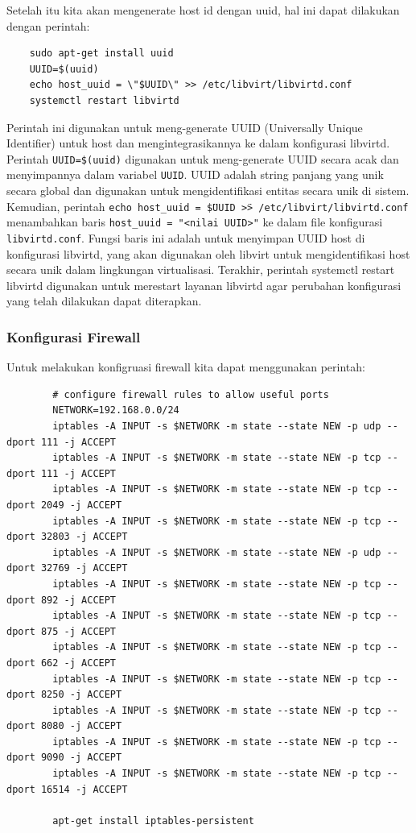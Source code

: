 Setelah itu kita akan mengenerate host id dengan uuid, hal ini dapat dilakukan dengan perintah:

\begin{listing}[H]
    \begin{verbatim}
    sudo apt-get install uuid
    UUID=$(uuid)
    echo host_uuid = \"$UUID\" >> /etc/libvirt/libvirtd.conf
    systemctl restart libvirtd
    \end{verbatim}
\end{listing}

Perintah ini digunakan untuk meng-generate UUID (Universally Unique Identifier) untuk host dan mengintegrasikannya ke dalam konfigurasi libvirtd. Perintah \texttt{UUID=\$(uuid)} digunakan untuk meng-generate UUID secara acak dan menyimpannya dalam variabel \texttt{UUID}. UUID adalah string panjang yang unik secara global dan digunakan untuk mengidentifikasi entitas secara unik di sistem. Kemudian, perintah \texttt{echo host\_uuid = \" \$UUID \"  >> /etc/libvirt/libvirtd.conf} menambahkan baris \texttt{host\_uuid = "<nilai UUID>"} ke dalam file konfigurasi \texttt{libvirtd.conf}. Fungsi baris ini adalah untuk menyimpan UUID host di konfigurasi libvirtd, yang akan digunakan oleh libvirt untuk mengidentifikasi host secara unik dalam lingkungan virtualisasi. Terakhir, perintah systemctl restart libvirtd digunakan untuk merestart layanan libvirtd agar perubahan konfigurasi yang telah dilakukan dapat diterapkan.

\subsubsection{Konfigurasi Firewall}
Untuk melakukan konfigruasi firewall kita dapat menggunakan perintah:

\begin{listing}[H]
    \begin{verbatim}
        # configure firewall rules to allow useful ports
        NETWORK=192.168.0.0/24
        iptables -A INPUT -s $NETWORK -m state --state NEW -p udp --dport 111 -j ACCEPT
        iptables -A INPUT -s $NETWORK -m state --state NEW -p tcp --dport 111 -j ACCEPT
        iptables -A INPUT -s $NETWORK -m state --state NEW -p tcp --dport 2049 -j ACCEPT
        iptables -A INPUT -s $NETWORK -m state --state NEW -p tcp --dport 32803 -j ACCEPT
        iptables -A INPUT -s $NETWORK -m state --state NEW -p udp --dport 32769 -j ACCEPT
        iptables -A INPUT -s $NETWORK -m state --state NEW -p tcp --dport 892 -j ACCEPT
        iptables -A INPUT -s $NETWORK -m state --state NEW -p tcp --dport 875 -j ACCEPT
        iptables -A INPUT -s $NETWORK -m state --state NEW -p tcp --dport 662 -j ACCEPT
        iptables -A INPUT -s $NETWORK -m state --state NEW -p tcp --dport 8250 -j ACCEPT
        iptables -A INPUT -s $NETWORK -m state --state NEW -p tcp --dport 8080 -j ACCEPT
        iptables -A INPUT -s $NETWORK -m state --state NEW -p tcp --dport 9090 -j ACCEPT
        iptables -A INPUT -s $NETWORK -m state --state NEW -p tcp --dport 16514 -j ACCEPT
        
        apt-get install iptables-persistent
    \end{verbatim}
\end{listing}

